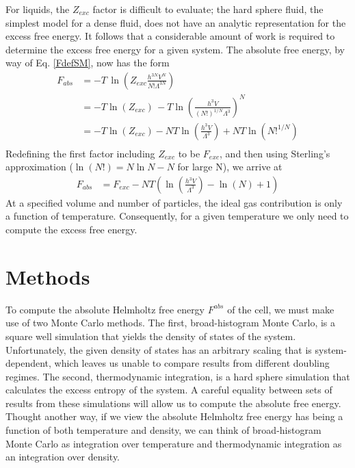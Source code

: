 \documentclass[12pt]{article}
\newcommand{\ignore}[1]{}
\begin{document}
For liquids, the $Z_{exc}$ factor is difficult to evaluate; the hard sphere fluid, the simplest model for a dense fluid, does not have an analytic representation for the excess free energy. It follows that a considerable amount of work is required to determine the excess free energy for a given system. The absolute free energy, by way of Eq. \ref{FdefSM}, now has the form
\begin{align}
    F_{abs} &= -T\,\ln\left(Z_{exc} \frac{h^{3N} V^N}{N!\Lambda^{3N}}\right)\\
    &= -T\ln\left(Z_{exc}\right)\, -T\ln\left(\frac{h^3 V}{(N!)^{1/N}\Lambda^3} \right)^N\\
    &= -T\ln\left(Z_{exc}\right) - NT\ln\left(\frac{h^3 V}{\Lambda^3}\right) + NT\ln\left(N!^{1/N}\right)\\     
\end{align}
Redefining the first factor including $Z_{exc}$ to be $F_{exc}$, and then using Sterling's approximation ($\ln(N!) = N\ln N - N$ for large N), we arrive at \ignore{\textcolor{red}{BRENDEN FIX: $N\ln N - N$, plus I think we may want to add to the excess free energy (probably to the excess HS entropy?) the difference?}}
\begin{align}
    F_{abs} &= F_{exc} - NT\left(\ln\left(\frac{h^3 V}{\Lambda^3}\right) - \ln\left(N\right) + 1\right)
\end{align}
At a specified volume and number of particles, the ideal gas contribution is only a function of temperature. Consequently, for a given temperature we only need to compute the excess free energy.

\section{Methods}
To compute the absolute Helmholtz free energy $F^{abs}$ of the cell, we must make use of two Monte Carlo methods. The first, broad-histogram Monte Carlo, is a square well simulation that yields the density of states of the system. Unfortunately, the given density of states has an arbitrary scaling that is system-dependent, which leaves us unable to compare results from different doubling regimes. The second, thermodynamic integration, is a hard sphere simulation that calculates the excess entropy of the system. A careful equality between sets of results from these simulations will allow us to compute the absolute free energy. Thought another way, if we view the absolute Helmholtz free energy has being a function of both temperature and density, we can think of broad-histogram Monte Carlo as integration over temperature and thermodynamic integration as an integration over density.
\end{document}
